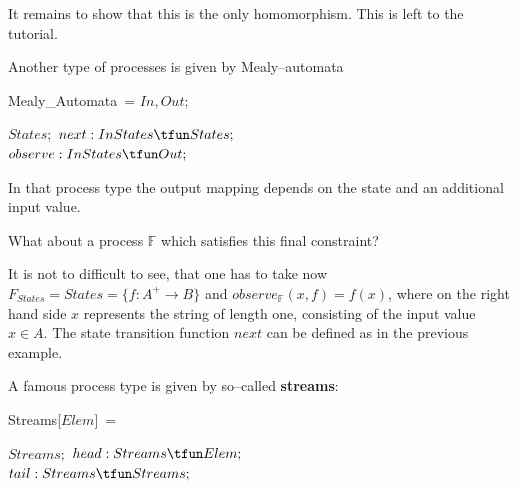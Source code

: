 \documentclass[landscape, autoslides, light]{mmiss}
\begin{document}
\begin{Package}[Label={FSDPT}, Title={Formal Specification of Data and Process Types}, ShortTitle={FSDPT}, Authors={Horst Reichel}, Date={February 2003}, LevelOfDetail=Lecture, Language=en-GB]
\begin{Section}[Title={Final Coalgebras as Process Types}, Label={section4}]
\begin{Section}[Title={Examples of Process Types}, Label={section4_2}]
\begin{Paragraph}[Label=Paragraph100]
 It remains to show that this is the only homomorphism. This is
 left to the tutorial.

\end{Paragraph}
 \begin{Paragraph}[Title={Mealy--automata}, Label=Paragraph101]

 Another type of processes is given by Mealy--automata

\begin{SpecDefn}{Mealy\_Automata}~=
\I\Sort \( In, Out; \) \item[\Then] \item[\Cofree~\Group]
\begin{Items}
\I\Sort \( States; \) \I\Ops \( next : In \* States \tfun
States;\) \\ \(observe :In \*  States \tfun Out; \)
 ~\EndGroup \end{Items}  \item[\End]
\end{SpecDefn}\pause

In that process type the output mapping depends on the state and
an additional input value.

\end{Paragraph}
 \begin{Paragraph}[Title={Mealy--automata}, Label=Paragraph102]

 What about a process $\mathbb{F}$ which
satisfies this final constraint?\pause \vspace{8mm}

It is not to difficult to see, that one has to take now
$F_{States} = {States} = \{ f : A^+ \to B \}$ and
$observe_{\mathbb{F}}(x,f) = f(x)$, where on the right hand side
$x$ represents the string of length one, consisting of the input
value $x \in A$. The state transition function $next$ can be
defined as in the previous example.

\end{Paragraph}
\begin{Paragraph}[Title={Streams}, Label=Paragraph103]

A famous process type is given by so--called \textbf{streams}:

\vspace{12mm}

\begin{SpecDefn}{Streams}[\Sort \(Elem\)]~=
\item[\Then] \item[\Cofree~\Group]
\begin{Items}
\I\Sort \( Streams; \) \I\Ops \( head : Streams  \tfun Elem;\)
\\ \(tail : Streams \tfun Streams; \)
 ~\EndGroup \end{Items}  \item[\End]
\end{SpecDefn}


\end{Paragraph}
\end{Section}
\end{Section}
\end{Package}
\end{document}
